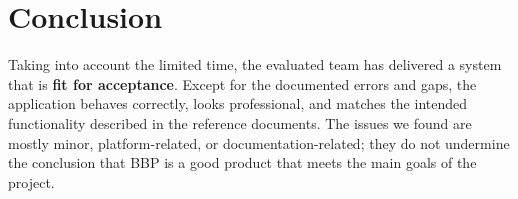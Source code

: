 \section{Conclusion}
\label{sec:conclusion_final}%
Taking into account the limited time, the evaluated team has delivered a system that is \textbf{fit for acceptance}. Except for the documented errors and gaps, the application behaves correctly, looks professional, and matches the intended functionality described in the reference documents. The issues we found are mostly minor, platform-related, or documentation-related; they do not undermine the conclusion that BBP is a good product that meets the main goals of the project.
